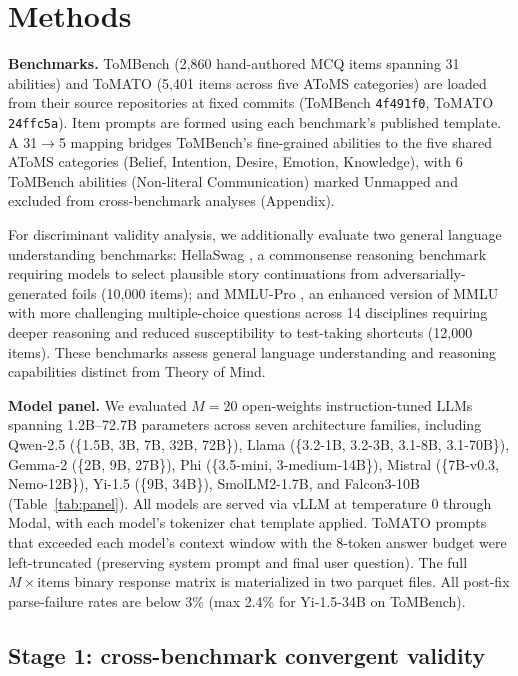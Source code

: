 \documentclass{article} %
\begin{document}
\section{Methods}
\label{sec:methods}

\textbf{Benchmarks.} ToMBench (2{,}860 hand-authored MCQ items spanning 31 abilities) and ToMATO (5{,}401 items across five AToMS categories) are loaded from their source repositories at fixed commits (ToMBench \texttt{4f491f0}, ToMATO \texttt{24ffc5a}). Item prompts are formed using each benchmark's published template. A 31$\to$5 mapping bridges ToMBench's fine-grained abilities to the five shared AToMS categories (Belief, Intention, Desire, Emotion, Knowledge), with 6 ToMBench abilities (Non-literal Communication) marked Unmapped and excluded from cross-benchmark analyses (Appendix).

For discriminant validity analysis, we additionally evaluate two general language understanding benchmarks: HellaSwag \citep{zellers2019hellaswag}, a commonsense reasoning benchmark requiring models to select plausible story continuations from adversarially-generated foils (10{,}000 items); and MMLU-Pro \citep{wang2024mmlu}, an enhanced version of MMLU with more challenging multiple-choice questions across 14 disciplines requiring deeper reasoning and reduced susceptibility to test-taking shortcuts (12{,}000 items). These benchmarks assess general language understanding and reasoning capabilities distinct from Theory of Mind.


\textbf{Model panel.} We evaluated $M=20$ open-weights instruction-tuned LLMs spanning 1.2B--72.7B parameters across seven architecture families, including Qwen-2.5 (\{1.5B, 3B, 7B, 32B, 72B\}), Llama (\{3.2-1B, 3.2-3B, 3.1-8B, 3.1-70B\}), Gemma-2 (\{2B, 9B, 27B\}), Phi (\{3.5-mini, 3-medium-14B\}), Mistral (\{7B-v0.3, Nemo-12B\}), Yi-1.5 (\{9B, 34B\}), SmolLM2-1.7B, and Falcon3-10B (Table~\ref{tab:panel}). All models are served via vLLM \citep{vllm2023} at temperature 0 through Modal, with each model's tokenizer chat template applied. ToMATO prompts that exceeded each model's context window with the 8-token answer budget were left-truncated (preserving system prompt and final user question). The full $M \times \text{items}$ binary response matrix is materialized in two parquet files. All post-fix parse-failure rates are below 3\% (max 2.4\% for Yi-1.5-34B on ToMBench).

\subsection{Stage 1: cross-benchmark convergent validity}
\label{sec:methods-stage1}
\end{document}
